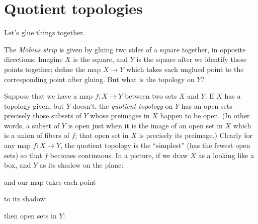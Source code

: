 \section{Quotient topologies}
Let's glue things together.
\begin{exampleAndImage}{1cm}
The \emph{M\"obius strip} is given by gluing two sides of a square together, in opposite directions.
Imagine \(X\) is the square, and \(Y\) is the square after we identify those points together; define the map \(X \to Y\) which takes each unglued point to the corresponding point after gluing.
But what is the topology on \(Y\)?
\tcblower

\end{exampleAndImage}
Suppose that we have a map \(f \colon X \to Y\) between two sets \(X\) and \(Y\).
If \(X\) has a topology given, but \(Y\) doesn't, the \emph{quotient topology}%
%
 on \(Y\) has an open sets precisely those subsets of \(Y\) whose preimages in \(X\) happen to be open.
(In other words, a subset of \(Y\) is open just when it is the image of an open set in \(X\) which is a union of fibers of \(f\); that open set in \(X\) is precisely its preimage.)
Clearly for any map \(f \colon X \to Y\), the quotient topology is the ``simplest'' (has the fewest open sets) so that \(f\) becomes continuous.
In a picture, if we draw \(X\) as a looking like a box, and \(Y\) as its shadow on the plane:
\begin{center}
\end{center}
and our map takes each point 
\begin{center}
\end{center}
to its shadow:
\begin{center}
\end{center}
then open sets in \(Y\):
\begin{center}
\end{center}
